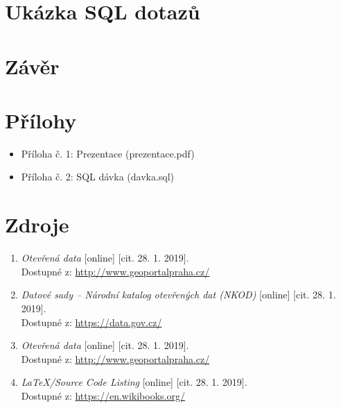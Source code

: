 \documentclass[a4paper, 12pt]{article}
\begin{document}
\section{Ukázka SQL dotazů}

\clearpage

\section{Závěr}


\clearpage

\section{Přílohy} 

\begin{itemize}
\item Příloha č. 1: Prezentace (prezentace.pdf)
\item Příloha č. 2: SQL dávka (davka.sql)
\end{itemize}

\clearpage

\section{Zdroje}
\begin{enumerate}
\item  \textsl{Otevřená data} [online] [cit. 28. 1. 2019].\\
Dostupné z: \href{http://www.geoportalpraha.cz/cs/opendata?fbclid=IwAR3dvAz20d2Anu-nuD9A7wC3byHUKTzDGTnlgQrmi0tC-t-SbSqN7Q5x-sA#.XE8ymWlCfIX}{http://www.geoportalpraha.cz/}

\item  \textsl{Datové sady – Národní katalog otevřených dat (NKOD)} [online] [cit. 28. 1. 2019].\\
Dostupné z: \href{https://data.gov.cz/datov\%C3\%A9-sady?dotaz=&fbclid=IwAR2jg2NvnsjO7BuHAgbXSJwh6VXFbsuXs0FONcle5ZfdPpO86Z_2C3YUQsU}{https://data.gov.cz/}

\item  \textsl{Otevřená data} [online] [cit. 28. 1. 2019].\\
Dostupné z: \href{http://www.geoportalpraha.cz/cs/opendata#.XE9RnWlCfIU}{http://www.geoportalpraha.cz/}

\item  \textsl{LaTeX/Source Code Listing} [online] [cit. 28. 1. 2019].\\
Dostupné z: \href{https://en.wikibooks.org/wiki/LaTeX/Source_Code_Listings}{https://en.wikibooks.org/}

\end{enumerate}
\end{document}
